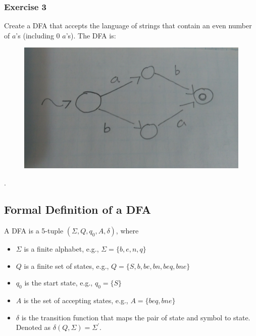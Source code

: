 \documentclass{report}
\begin{document}
\subsubsection{Exercise 3}
Create a DFA that accepts the language of strings that contain an even number of $a$'s (including 0 $a$'s). The DFA is:
\begin{figure}[ht]
\begin{center}
\includegraphics[scale=0.08]{dfa1.jpg}
\end{center}
\end{figure}.
\subsection{Formal Definition of a DFA}
A DFA is a 5-tuple $(\Sigma, Q, q_0, A, \delta)$, where
\begin{itemize}
\item $\Sigma$ is a finite alphabet, e.g., $\Sigma = \{b, e, n, q\}$
\item $Q$ is a finite set of states, e.g., $Q = \{S, b, be, bn, beq, bne\}$
\item $q_0$ is the start state, e.g., $q_0 = \{S\}$
\item $A$ is the set of accepting states, e.g., $A = \{beq, bne\}$
\item $\delta$ is the transition function that maps the pair of state and symbol to state. Denoted as $\delta(Q, \Sigma) = \Sigma^\prime$.
\end{itemize}
\end{document}
